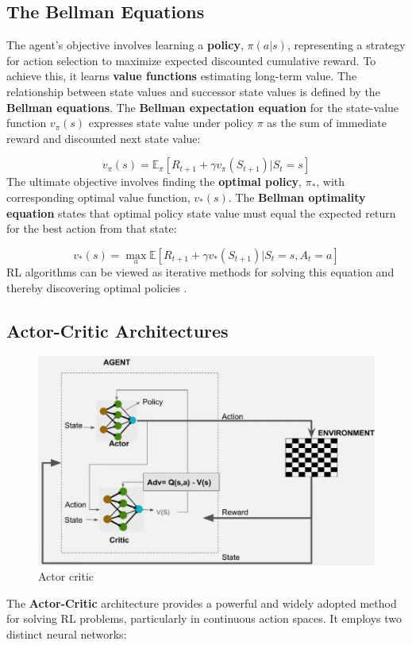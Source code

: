 \subsection{The Bellman Equations}

The agent's objective involves learning a \textbf{policy}, $\pi(a|s)$, representing a strategy for action selection to maximize expected discounted cumulative reward. To achieve this, it learns \textbf{value functions} estimating long-term value. The relationship between state values and successor state values is defined by the \textbf{Bellman equations}.
\noindent
The \textbf{Bellman expectation equation} for the state-value function $v_{\pi}(s)$ expresses state value under policy $\pi$ as the sum of immediate reward and discounted next state value:

\begin{equation}
v_{\pi}(s) = \mathbb{E}_{\pi} \left[ R_{t+1} + \gamma v_{\pi}(S_{t+1}) | S_t = s \right]
\end{equation}
\noindent
The ultimate objective involves finding the \textbf{optimal policy}, $\pi_*$, with corresponding optimal value function, $v_*(s)$. The \textbf{Bellman optimality equation} states that optimal policy state value must equal the expected return for the best action from that state:

\begin{equation}
v_*(s) = \max_{a} \mathbb{E} \left[ R_{t+1} + \gamma v_*(S_{t+1}) | S_t = s, A_t = a \right]
\end{equation}
\noindent
RL algorithms can be viewed as iterative methods for solving this equation and thereby discovering optimal policies \cite{Xie2025}.

\subsection{Actor-Critic Architectures}
\begin{figure}[H]
    \centering
    \includegraphics[width=0.75\linewidth]{a2c.png}
    \caption{Actor critic}
    \label{fig:placeholder}
\end{figure}
The \textbf{Actor-Critic} architecture provides a powerful and widely adopted method for solving RL problems, particularly in continuous action spaces. It employs two distinct neural networks:

